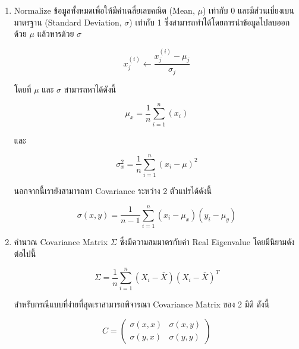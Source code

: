 \begin{enumerate}
    \item Normalize ข้อมูลทั้งหมดเพื่อให้มีค่าเฉลี่ยเลขคณิต (Mean, $\mu$) เท่ากับ 0 และมีส่วนเบี่ยงเบนมาตรฐาน (Standard Deviation, 
    $\sigma$) เท่ากับ 1 ซึ่งสามารถทำได้โดยการนำข้อมูลไปลบออกด้วย $\mu$ แล้วหารด้วย $\sigma$

    \begin{equation}\label{eq:normalize}
        x^{(i)}_{j} \leftarrow \frac{x^{(i)}_{j} - \mu_{j}}{\sigma_{j}}
    \end{equation}

    \noindent โดยที่ $\mu$ และ $\sigma$ สามารถหาได้ดังนี้

    \begin{equation}\label{eq:mean}
        \mu_{x} = \frac{1}{n} \sum^{n}_{i=1}(x_{i})
    \end{equation}

    \noindent และ

    \begin{equation}\label{eq:variance}
        \sigma^2_{x} = \frac{1}{n} \sum^{n}_{i=1}(x_{i} - \mu)^2 
    \end{equation}

    \noindent นอกจากนี้เรายังสามารถหา Covariance ระหว่าง 2 ตัวแปรได้ดังนี้

    \begin{equation}\label{eq:covariance}
        \sigma(x, y) = \frac{1}{n-1} \sum^{n}_{i=1}{(x_i - \mu_{x})(y_i - \mu_{y})}
    \end{equation}

    \item คำนวณ Covariance Matrix $\Sigma$ ซึ่งมีความสมมาตรกับค่า Real Eigenvalue โดยมีนิยามดังต่อไปนี้

    \begin{equation}
        \Sigma = \frac{1}{n} \sum^{n}_{i=1}{(X_i-\bar{X})(X_i-\bar{X})^T}
    \end{equation}

    \noindent สำหรับกรณีแบบที่ง่ายที่สุดเราสามารถพิจารณา Covariance Matrix ของ 2 มิติ ดังนี้

    \begin{equation}\label{eq:cov_mat_2d}
        C = \left( \begin{array}{ccc}  \sigma(x, x) & \sigma(x, y) \\  
            \sigma(y, x) & \sigma(y, y) \end{array} \right)
    \end{equation}


\end{enumerate}
